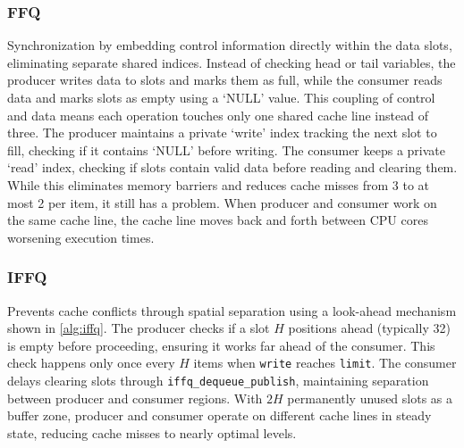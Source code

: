 \subsubsection{\ac{FFQ}}
Synchronization by embedding control information directly within the data slots, eliminating separate shared indices. Instead of checking head or tail variables, the producer writes data to slots and marks them as full, while the consumer reads data and marks slots as empty using a \enquote*{NULL} value. This coupling of control and data means each operation touches only one shared cache line instead of three. The producer maintains a private \enquote*{write} index tracking the next slot to fill, checking if it contains \enquote*{NULL} before writing. The consumer keeps a private \enquote*{read} index, checking if slots contain valid data before reading and clearing them. While this eliminates memory barriers and reduces cache misses from 3 to at most 2 per item, it still has a problem. When producer and consumer work on the same cache line, the cache line moves back and forth between CPU cores worsening execution times. \cite{ffq}

\subsubsection{\acf{IFFQ}}
Prevents cache conflicts through spatial separation using a look-ahead mechanism shown in \cref{alg:iffq}. The producer checks if a slot $H$ positions ahead (typically 32) is empty before proceeding, ensuring it works far ahead of the consumer. This check happens only once every $H$ items when \texttt{write} reaches \texttt{limit}. The consumer delays clearing slots through \texttt{iffq\_dequeue\_publish}, maintaining separation between producer and consumer regions. With $2H$ permanently unused slots as a buffer zone, producer and consumer operate on different cache lines in steady state, reducing cache misses to nearly optimal levels. \cite{MaffioneCacheAware}

